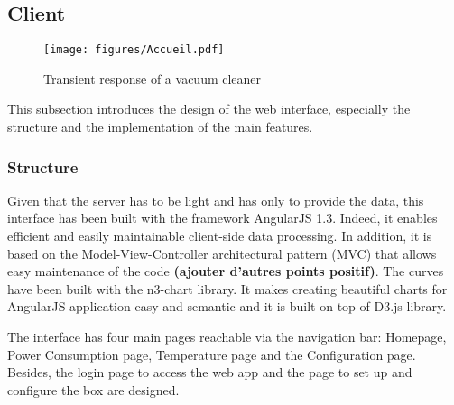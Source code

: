 \subsection{Client} %
\begin{figure}[H]
\centering
\texttt{[image: figures/Accueil.pdf]}
\caption{Transient response of a vacuum cleaner}
\label{fig:transient_response}
\end{figure}
This subsection introduces the design of the web interface, especially the structure and the implementation of the main features.

\subsubsection{Structure}
    Given that the server has to be light and has only to provide the data, this interface has been built with the framework AngularJS 1.3. Indeed, it enables efficient and easily maintainable client-side data processing. In addition, it is based on the Model-View-Controller architectural pattern (MVC) that allows easy maintenance of the code \textbf{(ajouter d'autres points positif)}. The curves have been built with the n3-chart library. It makes creating beautiful charts for AngularJS application easy and semantic and it is built on top of D3.js library.
    
    The interface has four main pages reachable via the navigation bar: Homepage, Power Consumption page, Temperature page and the Configuration page. Besides, the login page to access the web app and the page to set up and configure the box are designed.
     
